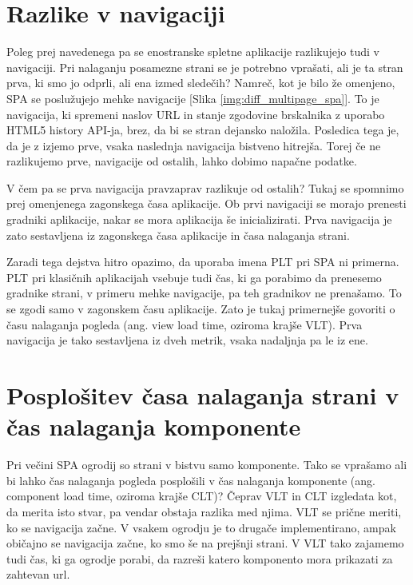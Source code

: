 \documentclass[a4paper, 12pt]{book}
\begin{document}
\FloatBarrier

\section{Razlike v navigaciji}
\label{ch1:sec3}

Poleg prej navedenega pa se enostranske spletne aplikacije razlikujejo tudi v navigaciji. Pri nalaganju posamezne strani se je potrebno vprašati, ali je ta stran prva, ki smo jo odprli, ali ena izmed sledečih? Namreč, kot je bilo že omenjeno, SPA se poslužujejo mehke navigacije [Slika \ref{img:diff_multipage_spa}]. To je navigacija, ki spremeni naslov URL in stanje zgodovine brskalnika z uporabo HTML5 history API-ja, brez, da bi se stran dejansko naložila. Posledica tega je, da je z izjemo prve, vsaka naslednja navigacija bistveno hitrejša. Torej če ne razlikujemo prve,  navigacije od ostalih, lahko  dobimo napačne podatke.

V čem pa se prva navigacija pravzaprav razlikuje od ostalih? Tukaj se spomnimo prej omenjenega zagonskega časa aplikacije. Ob prvi navigaciji se morajo prenesti gradniki aplikacije, nakar se mora aplikacija še inicializirati. Prva navigacija je zato sestavljena iz zagonskega časa aplikacije in časa nalaganja strani.

Zaradi tega dejstva hitro opazimo, da uporaba imena PLT pri SPA ni primerna. PLT pri klasičnih aplikacijah vsebuje tudi čas, ki ga porabimo da prenesemo gradnike strani, v primeru mehke navigacije, pa teh gradnikov ne prenašamo. To se zgodi samo v zagonskem času aplikacije. Zato je tukaj primernejše govoriti o času nalaganja pogleda (ang. view load time, oziroma krajše VLT). Prva navigacija je tako sestavljena iz dveh metrik, vsaka nadaljnja pa le iz ene.

\section{Posplošitev časa nalaganja strani v čas nalaganja komponente}
\label{ch1:sec4}

Pri večini SPA ogrodij so strani v bistvu samo komponente. Tako se vprašamo ali bi lahko čas nalaganja pogleda posplošili v čas nalaganja komponente (ang. component load time, oziroma krajše CLT)? Čeprav VLT in CLT izgledata kot, da merita isto stvar, pa vendar obstaja razlika med njima. VLT se prične meriti, ko se navigacija začne. V vsakem ogrodju je to drugače implementirano, ampak običajno se navigacija začne, ko smo še na prejšnji strani. V VLT tako zajamemo tudi čas, ki ga ogrodje porabi, da razreši katero komponento mora prikazati za zahtevan url.
\end{document}
